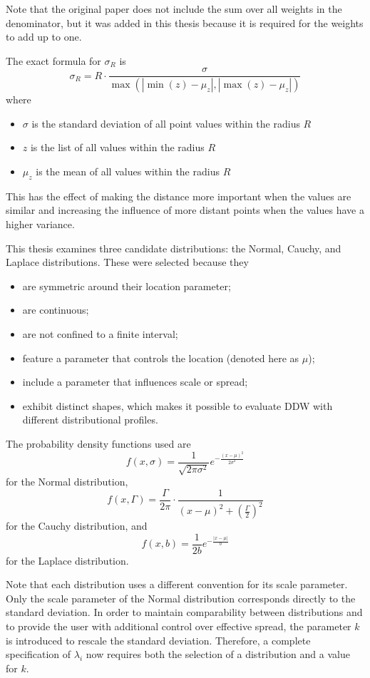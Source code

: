 Note that the original paper does not include the sum over all weights in the denominator, but it was added in this thesis because it is required for the weights to add up to one.

The exact formula for $\sigma_R$ is
\[
\sigma_R=R\cdot\frac{\sigma}{\max(|\min(z)-\mu_z|,|\max(z)-\mu_z|)}
\]
where
\begin{itemize}
    \item $\sigma$ is the standard deviation of all point values within the radius $R$
    \item $z$ is the list of all values within the radius $R$
    \item $\mu_z$ is the mean of all values within the radius $R$
\end{itemize}

This has the effect of making the distance more important when the values are similar and increasing the influence of more distant points when the values have a higher variance.

This thesis examines three candidate distributions: the Normal, Cauchy, and Laplace distributions. These were selected because they
\begin{itemize}
    \item are symmetric around their location parameter;
    \item are continuous;
    \item are not confined to a finite interval;
    \item feature a parameter that controls the location (denoted here as $\mu$);
    \item include a parameter that influences scale or spread;
    \item exhibit distinct shapes, which makes it possible to evaluate DDW with different distributional profiles.
\end{itemize}

The probability density functions used are
\[
f(x,\sigma)=\frac{1}{\sqrt{2\pi\sigma^2}}e^{-\frac{{(x-\mu)}^2}{2\sigma^2}}
\]
for the Normal distribution,
\[
f(x,\Gamma)=\frac{\Gamma}{2\pi}\cdot\frac{1}{{(x-\mu)}^2+{\left(\frac{\Gamma}{2}\right)}^2}
\]
for the Cauchy distribution, and
\[
f(x,b)=\frac{1}{2b}e^{-\frac{|x-\mu|}{b}}
\]
for the Laplace distribution.

Note that each distribution uses a different convention for its scale parameter. Only the scale parameter of the Normal distribution corresponds directly to the standard deviation. In order to maintain comparability between distributions and to provide the user with additional control over effective spread, the parameter $k$ is introduced to rescale the standard deviation. Therefore, a complete specification of $\lambda_i$ now requires both the selection of a distribution and a value for $k$.\ \cite{mdpi:01}

